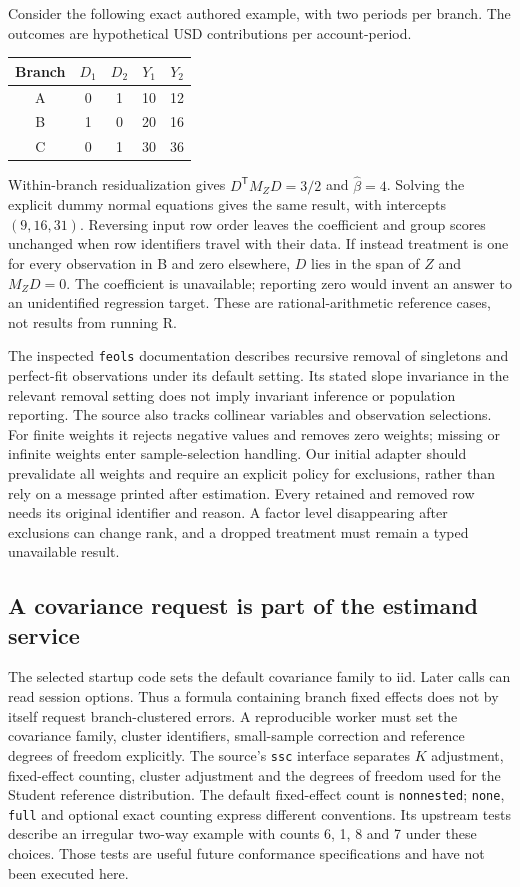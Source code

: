 Consider the following exact authored example, with two periods per branch.
The outcomes are hypothetical USD contributions per account-period.
\begin{center}
\begin{tabular}{c|cc|cc}
Branch & $D_1$ & $D_2$ & $Y_1$ & $Y_2$\\\hline
A & 0 & 1 & 10 & 12\\
B & 1 & 0 & 20 & 16\\
C & 0 & 1 & 30 & 36
\end{tabular}
\end{center}
Within-branch residualization gives $D^{\mathsf T}M_ZD=3/2$ and
$\widehat\beta=4$. Solving the explicit dummy normal equations gives the
same result, with intercepts $(9,16,31)$. Reversing input row order leaves
the coefficient and group scores unchanged when row identifiers travel with
their data. If instead treatment is one for every observation in B and zero
elsewhere, $D$ lies in the span of $Z$ and $M_ZD=0$. The coefficient is
unavailable; reporting zero would invent an answer to an unidentified
regression target. These are rational-arithmetic reference cases,
not results from running R.~\citep{exec20_fixest_reference}

The inspected \texttt{feols} documentation describes recursive removal of
singletons and perfect-fit observations under its default setting. Its stated
slope invariance in the relevant removal setting does not imply invariant
inference or population reporting. The source also tracks collinear variables
and observation selections. For finite weights it rejects negative values
and removes zero weights; missing or infinite weights enter sample-selection
handling. Our initial adapter should prevalidate all weights and require an
explicit policy for exclusions, rather than rely on a message printed after
estimation. Every retained and removed row needs its original identifier and
reason. A factor level disappearing after exclusions can change rank, and a
dropped treatment must remain a typed unavailable result.~\citep{exec20_fixest_source}

\subsection{A covariance request is part of the estimand service}
\label{exec20:fx-covariance}
The selected startup code sets the default covariance family to iid. Later
calls can read session options. Thus a formula containing branch fixed effects
does not by itself request branch-clustered errors. A reproducible worker
must set the covariance family, cluster identifiers, small-sample correction
and reference degrees of freedom explicitly. The source's \texttt{ssc}
interface separates $K$ adjustment, fixed-effect counting, cluster adjustment
and the degrees of freedom used for the Student reference distribution.
The default fixed-effect count is \texttt{nonnested}; \texttt{none},
\texttt{full} and optional exact counting express different conventions.
Its upstream tests describe an irregular two-way example with counts 6, 1,
8 and 7 under these choices. Those tests are useful future conformance
specifications and have not been executed here.~\citep{exec20_fixest_source}

